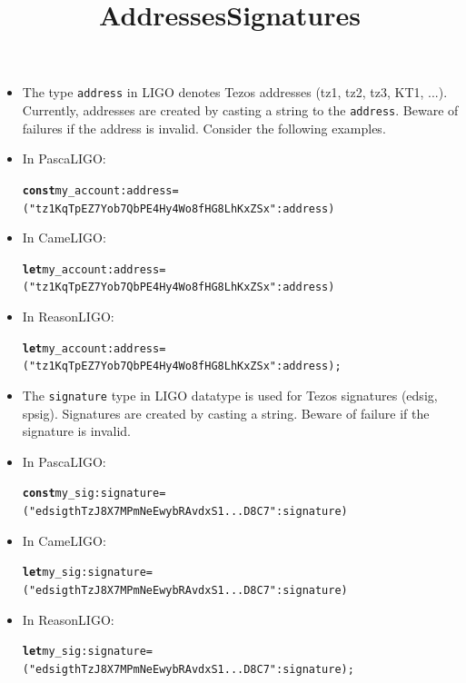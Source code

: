 \documentclass[wide]{slides}
\newcommand{\Kconst}[0]{\textbf{const}\xspace}
\newcommand{\Klet}[0]{\textbf{let}\xspace}
\begin{document}
\begin{slide}
  \title{Addresses}

  \begin{itemize}

    \item The type \texttt{address} in LIGO denotes Tezos addresses
      (tz1, tz2, tz3, KT1, ...). Currently, addresses are created by
      casting a string to the \texttt{address}. Beware of failures if
      the address is invalid. Consider the following examples.

    \item In PascaLIGO:
      \begin{alltt}
\Kconst my_account : address =
  ("tz1KqTpEZ7Yob7QbPE4Hy4Wo8fHG8LhKxZSx" : address)
      \end{alltt}

    \item In CameLIGO:
      \begin{alltt}
\Klet my_account : address =
  ("tz1KqTpEZ7Yob7QbPE4Hy4Wo8fHG8LhKxZSx" : address)
      \end{alltt}

    \item In ReasonLIGO:
      \begin{alltt}
\Klet my_account : address =
  ("tz1KqTpEZ7Yob7QbPE4Hy4Wo8fHG8LhKxZSx" : address);
      \end{alltt}


  \end{itemize}

\end{slide}

\begin{slide}
  \title{Signatures}

  \begin{itemize}

    \item The \texttt{signature} type in LIGO datatype is used for
      Tezos signatures (edsig, spsig). Signatures are created by
      casting a string. Beware of failure if the signature is invalid.

    \item In PascaLIGO:
      \begin{alltt}
\Kconst my_sig : signature =
  ("edsigthTzJ8X7MPmNeEwybRAvdxS1...D8C7" : signature)
      \end{alltt}

    \item In CameLIGO:
      \begin{alltt}
\Klet my_sig : signature =
   ("edsigthTzJ8X7MPmNeEwybRAvdxS1...D8C7" : signature)
      \end{alltt}

    \item In ReasonLIGO:
      \begin{alltt}
\Klet my_sig : signature =
  ("edsigthTzJ8X7MPmNeEwybRAvdxS1...D8C7" : signature);
      \end{alltt}

  \end{itemize}

\end{slide}
\end{document}
